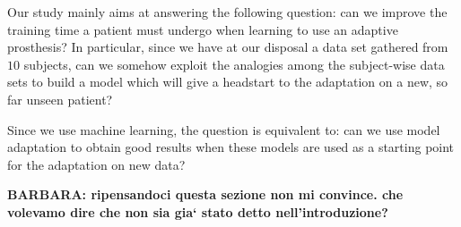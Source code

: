 Our study mainly aims at answering the following question: can we
improve the training time a patient must undergo when learning to use
an adaptive prosthesis? In particular, since we have at our disposal a
data set gathered from $10$ subjects, can we somehow exploit the
analogies among the subject-wise data sets to build a model which will
give a headstart to the adaptation on a new, so far unseen patient?

Since we use machine learning, the question is equivalent to: can we
use model adaptation to obtain good results when these models are used
as a starting point for the adaptation on new data?

\textbf{BARBARA: ripensandoci questa sezione non mi convince. che
volevamo dire che non sia gia` stato detto nell'introduzione?}
